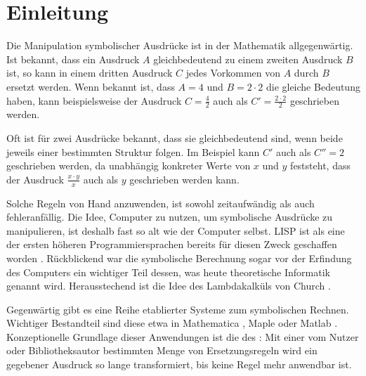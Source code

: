 

\chapter{Einleitung} \label{secEinleitung}

Die Manipulation symbolischer Ausdrücke ist in der Mathematik allgegenwärtig. Ist bekannt, dass ein Ausdruck $A$ gleichbedeutend zu einem zweiten Ausdruck $B$ ist, so kann in einem dritten Ausdruck $C$ jedes Vorkommen von $A$ durch $B$ ersetzt werden. 
Wenn bekannt ist, dass $A = 4$ und $B = 2 \cdot 2$ die gleiche Bedeutung haben, kann beispielsweise der Ausdruck $C = \frac{4}{2}$ auch als $C' = \frac{2 \cdot 2}{2}$ geschrieben werden.

Oft ist für zwei Ausdrücke bekannt, dass sie gleichbedeutend sind, wenn beide jeweils einer bestimmten Struktur folgen. Im Beispiel kann $C'$ auch als $C'' = 2$ geschrieben werden, da unabhängig konkreter Werte von $x$ und $y$ feststeht, dass der Ausdruck $\frac{x \cdot y}{x}$ auch als $y$ geschrieben werden kann.

Solche Regeln von Hand anzuwenden, ist sowohl zeitaufwändig als auch fehleranfällig. 
Die Idee, Computer zu nutzen, um symbolische Ausdrücke zu manipulieren, ist deshalb fast so alt wie der Computer selbst.  LISP ist als eine der ersten höheren Programmiersprachen bereits für diesen Zweck geschaffen worden \cite{lisp}. Rückblickend war die symbolische Berechnung sogar vor der Erfindung des Computers ein wichtiger Teil dessen, was heute theoretische Informatik genannt wird. Herausstechend ist die Idee des Lambdakalküls von Church \cite{ChurchLambda36}. 

Gegenwärtig gibt es eine Reihe etablierter Systeme zum symbolischen Rechnen. Wichtiger Bestandteil sind diese etwa in Mathematica \cite{MathematicaSymbolic}, Maple \cite{MapleSymbolic} oder Matlab \cite{MatlabSymbolic}.
Konzeptionelle Grundlage dieser Anwendungen ist die des : Mit einer vom Nutzer oder Bibliotheksautor bestimmten Menge von Ersetzungsregeln wird ein gegebener Ausdruck so lange transformiert, bis keine Regel mehr anwendbar ist.


